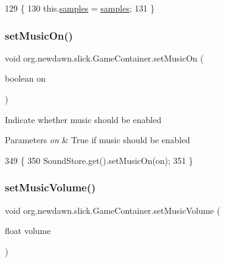 \begin{DoxyCode}
129                                             \{
130         this.\mbox{\hyperlink{classorg_1_1newdawn_1_1slick_1_1_game_container_af37ac6c2d7d33d4fac82860184cafff6}{samples}} = \mbox{\hyperlink{classorg_1_1newdawn_1_1slick_1_1_game_container_af37ac6c2d7d33d4fac82860184cafff6}{samples}};
131     \}
\end{DoxyCode}
\mbox{\label{classorg_1_1newdawn_1_1slick_1_1_game_container_a161bebb71ba1c82f7ae6264c6d872a0b}} 
\subsubsection{\texorpdfstring{set\+Music\+On()}{setMusicOn()}}
{\footnotesize\ttfamily void org.\+newdawn.\+slick.\+Game\+Container.\+set\+Music\+On (\begin{DoxyParamCaption}\item[{boolean}]{on }\end{DoxyParamCaption})\hspace{0.3cm}{\ttfamily [inline]}}

Indicate whether music should be enabled


\begin{DoxyParams}{Parameters}
{\em on} & True if music should be enabled \\
\hline
\end{DoxyParams}

\begin{DoxyCode}
349                                        \{
350         SoundStore.get().setMusicOn(on);
351     \}
\end{DoxyCode}
\mbox{\label{classorg_1_1newdawn_1_1slick_1_1_game_container_aec3a92df093fecdc3093b38c7b57b0bf}} 
\subsubsection{\texorpdfstring{set\+Music\+Volume()}{setMusicVolume()}}
{\footnotesize\ttfamily void org.\+newdawn.\+slick.\+Game\+Container.\+set\+Music\+Volume (\begin{DoxyParamCaption}\item[{float}]{volume }\end{DoxyParamCaption})\hspace{0.3cm}{\ttfamily [inline]}}

